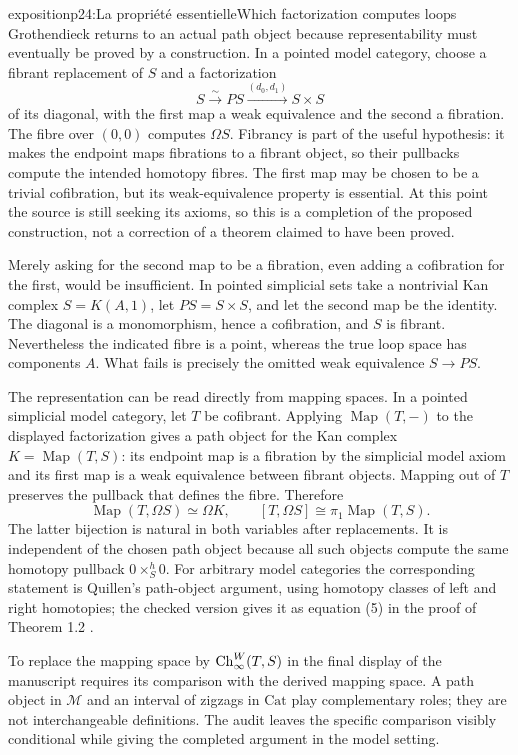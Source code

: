 \begin{dcomment}{exposition}{p24:La propriété essentielle}{Which factorization computes loops}
Grothendieck returns to an actual path object because representability must eventually be proved by a construction. In a pointed model category, choose a fibrant replacement of $S$ and a factorization
\[
 S\xrightarrow{\sim}P S\xrightarrow{(d_0,d_1)}S\times S
\]
of its diagonal, with the first map a weak equivalence and the second a fibration. The fibre over $(0,0)$ computes $\Omega S$. Fibrancy is part of the useful hypothesis: it makes the endpoint maps fibrations to a fibrant object, so their pullbacks compute the intended homotopy fibres. The first map may be chosen to be a trivial cofibration, but its weak-equivalence property is essential. At this point the source is still seeking its axioms, so this is a completion of the proposed construction, not a correction of a theorem claimed to have been proved.

Merely asking for the second map to be a fibration, even adding a cofibration for the first, would be insufficient. In pointed simplicial sets take a nontrivial Kan complex $S=K(A,1)$, let $P S=S\times S$, and let the second map be the identity. The diagonal is a monomorphism, hence a cofibration, and $S$ is fibrant. Nevertheless the indicated fibre is a point, whereas the true loop space has components $A$. What fails is precisely the omitted weak equivalence $S\to P S$.

The representation can be read directly from mapping spaces. In a pointed simplicial model category, let $T$ be cofibrant. Applying $\operatorname{Map}(T,-)$ to the displayed factorization gives a path object for the Kan complex $K=\operatorname{Map}(T,S)$: its endpoint map is a fibration by the simplicial model axiom and its first map is a weak equivalence between fibrant objects. Mapping out of $T$ preserves the pullback that defines the fibre. Therefore
\[
 \operatorname{Map}(T,\Omega S)\simeq\Omega K,
 \qquad
 [T,\Omega S]\cong\pi_1\operatorname{Map}(T,S).
\]
The latter bijection is natural in both variables after replacements. It is independent of the chosen path object because all such objects compute the same homotopy pullback $0\times_S^h0$. For arbitrary model categories the corresponding statement is Quillen's path-object argument, using homotopy classes of left and right homotopies; the checked version gives it as equation (5) in the proof of Theorem 1.2 \citep[Chapter I, \S2]{Quillen1967}.

To replace the mapping space by $\mathrm{Ch}_\infty^W(T,S)$ in the final display of the manuscript requires its comparison with the derived mapping space. A path object in $\mathcal M$ and an interval of zigzags in $\mathrm{Cat}$ play complementary roles; they are not interchangeable definitions. The audit leaves the specific comparison visibly conditional while giving the completed argument in the model setting.
\end{dcomment}


